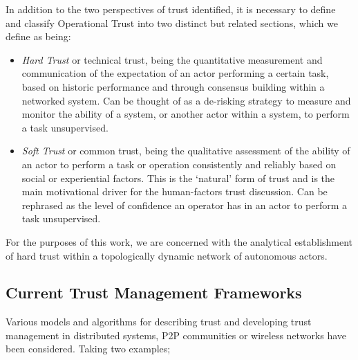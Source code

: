 \documentclass[runningheads,a4paper]{llncs}
\begin{document}
In addition to the two perspectives of trust identified, it is necessary to define and classify Operational Trust into two distinct but related sections, which we define as being:
\begin{itemize}
  \item \emph{Hard Trust} or technical trust, being the quantitative measurement and communication of the expectation of an actor performing a certain task, based on historic performance and through consensus building within a networked system. Can be thought of as a de-risking strategy to measure and monitor the ability of a system, or another actor within a system, to perform a task unsupervised.
  \item \emph{Soft Trust} or common trust, being the qualitative assessment of the ability of an actor to perform a task or operation consistently and reliably based on social or experiential factors. This is the ‘natural’ form of trust and is the main motivational driver for the human-factors trust discussion. Can be rephrased as the level of confidence an operator has in an actor to perform a task unsupervised.
\end{itemize} 

For the purposes of this work, we are concerned with the analytical establishment of hard trust within a topologically dynamic network of autonomous actors.

\subsection{Current Trust Management Frameworks}

Various models and algorithms for describing trust and developing trust management in distributed systems, P2P communities or wireless networks have been considered. Taking two examples;
\end{document}
